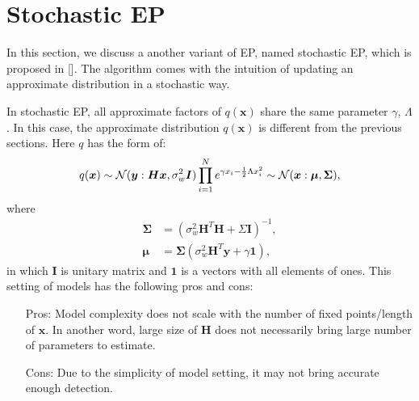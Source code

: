 \documentclass{article}
\begin{document}
\section{Stochastic EP}\label{sec:stochasticEP}
In this section, we discuss a another variant of EP, named stochastic EP, which is proposed in []. The algorithm comes with the intuition of updating an approximate distribution in a stochastic way.

In stochastic EP, all approximate factors of $q(\bm{x})$ share the same parameter $\gamma$, $\Lambda$. In this case, the approximate distribution $q(\bm{x})$ is different from the previous sections. Here $q$ has the form of:
\begin{equation}
  q(\bm{x}) \sim \mathcal{N}(\bm{y}: \bm{H}\bm{x}, \sigma_w^2 \bm{I}) \prod_{i=1}^{N} e^{\gamma x_i - \frac{1}{2}\Lambda x_i^2} \sim \mathcal{N}(\bm{x}: \bm{\mu}, \bm{\Sigma}),
\end{equation}
where
\begin{align}
  \bm{\Sigma} &= (\sigma_w^2\bm{H}^T\bm{H} + \Sigma \bm{I})^{-1},\\
  \bm{\mu} & = \bm{\Sigma} ( \sigma_w^2\bm{H}^T\bm{y} + \gamma \bm{1}),
\end{align}
in which $\bm{I}$ is unitary matrix and $\bm{1}$ is a vectors with all elements of ones. This setting of models has the following pros and cons:
\begin{itemize}
\item[Pros:] Model complexity does not scale with the number of fixed points/length of $\bm{x}$. In another word, large size of $\bm{H}$ does not necessarily bring large number of parameters to estimate.
\item[Cons:] Due to the simplicity of model setting, it may not bring accurate enough detection.
\end{itemize}
\end{document}

